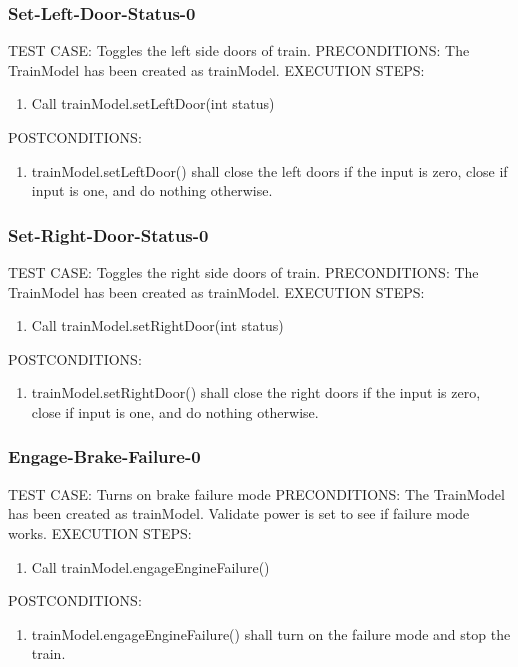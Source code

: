 \documentclass{scrreprt}
\begin{document}
\subsubsection{Set-Left-Door-Status-0}
TEST CASE: Toggles the left side doors of train.
PRECONDITIONS: The TrainModel has been created as trainModel.
EXECUTION STEPS:
\begin{enumerate}
	\item Call trainModel.setLeftDoor(int status)
\end{enumerate}
POSTCONDITIONS:
\begin{enumerate}
	\item trainModel.setLeftDoor() shall close the left doors if the input is zero, close if input is one, and do nothing otherwise.
\end{enumerate}

\subsubsection{Set-Right-Door-Status-0}
TEST CASE: Toggles the right side doors of train.
PRECONDITIONS: The TrainModel has been created as trainModel.
EXECUTION STEPS:
\begin{enumerate}
	\item Call trainModel.setRightDoor(int status)
\end{enumerate}
POSTCONDITIONS:
\begin{enumerate}
	\item trainModel.setRightDoor() shall close the right doors if the input is zero, close if input is one, and do nothing otherwise.
\end{enumerate}

\subsubsection{Engage-Brake-Failure-0}
TEST CASE: Turns on brake failure mode
PRECONDITIONS: The TrainModel has been created as trainModel. Validate power is set to see if failure mode works.
EXECUTION STEPS:
\begin{enumerate}
	\item Call trainModel.engageEngineFailure()
\end{enumerate}
POSTCONDITIONS:
\begin{enumerate}
	\item trainModel.engageEngineFailure() shall turn on the failure mode and stop the train.
\end{enumerate}
\end{document}
